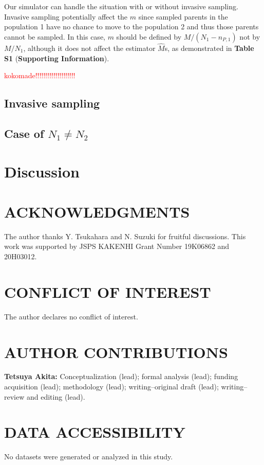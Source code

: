 \documentclass[12pt, English]{article}
\def\RED#1{\textcolor{red}{#1}} %
\begin{document}
\begin{spacing}{1.9}
Our simulator can handle the situation with or without invasive sampling. Invasive sampling potentially affect the $m$ since sampled parents in the population 1 have no chance to move to the population 2 and thus those parents cannot be sampled. In this case, $m$ should be defined by $M/(N_1-n_{P,1})$ not by $M/N_1$, although it does not affect the estimator ${\hat M}$s, as demonstrated in {\bf Table S1} ({\bf Supporting Information}). 

\RED{kokomade!!!!!!!!!!!!!!!!!!!!}
\subsection{Invasive sampling}

\subsection{Case of $N_1 \neq N_2$}







\section{Discussion}\label{sec4}


\section*{ACKNOWLEDGMENTS}
The author thanks Y. Tsukahara and N. Suzuki for fruitful discussions. This work was supported by JSPS KAKENHI Grant Number 19K06862 and 20H03012.

\section*{CONFLICT OF INTEREST}
The author declares no conflict of interest.

\section*{AUTHOR CONTRIBUTIONS}
{\bf Tetsuya Akita:} Conceptualization (lead); formal analysis (lead); funding acquisition (lead); methodology (lead); writing--original draft (lead); writing--review and editing (lead).

\section*{DATA ACCESSIBILITY}
No datasets were generated or analyzed in this study.


\end{spacing}
\end{document}
